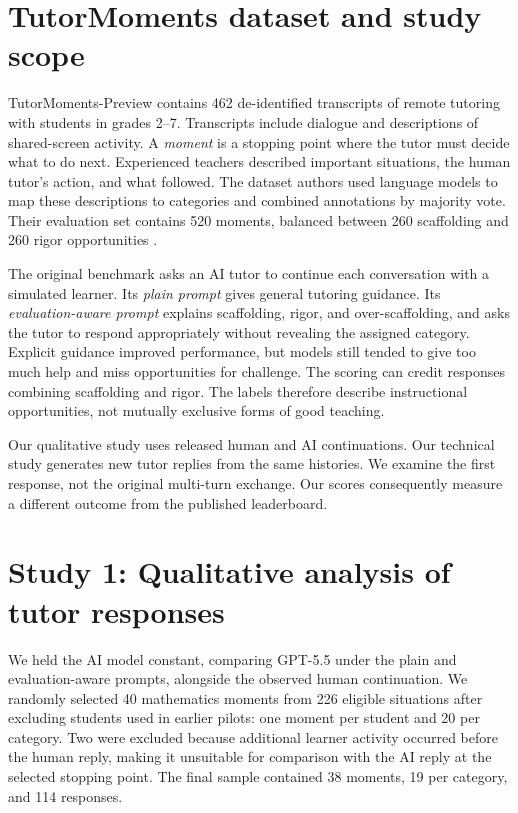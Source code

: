 \documentclass[10pt,a4paper]{article}
\begin{document}
\section{TutorMoments dataset and study scope}
TutorMoments-Preview contains 462 de-identified transcripts of remote tutoring with students in grades 2--7. Transcripts include dialogue and descriptions of shared-screen activity. A \emph{moment} is a stopping point where the tutor must decide what to do next. Experienced teachers described important situations, the human tutor's action, and what followed. The dataset authors used language models to map these descriptions to categories and combined annotations by majority vote. Their evaluation set contains 520 moments, balanced between 260 scaffolding and 260 rigor opportunities \citep{zhang2026tutormoments}.

The original benchmark asks an AI tutor to continue each conversation with a simulated learner. Its \emph{plain prompt} gives general tutoring guidance. Its \emph{evaluation-aware prompt} explains scaffolding, rigor, and over-scaffolding, and asks the tutor to respond appropriately without revealing the assigned category. Explicit guidance improved performance, but models still tended to give too much help and miss opportunities for challenge. The scoring can credit responses combining scaffolding and rigor. The labels therefore describe instructional opportunities, not mutually exclusive forms of good teaching.

Our qualitative study uses released human and AI continuations. Our technical study generates new tutor replies from the same histories. We examine the first response, not the original multi-turn exchange. Our scores consequently measure a different outcome from the published leaderboard.

\section{Study 1: Qualitative analysis of tutor responses}
We held the AI model constant, comparing GPT-5.5 under the plain and evaluation-aware prompts, alongside the observed human continuation. We randomly selected 40 mathematics moments from 226 eligible situations after excluding students used in earlier pilots: one moment per student and 20 per category. Two were excluded because additional learner activity occurred before the human reply, making it unsuitable for comparison with the AI reply at the selected stopping point. The final sample contained 38 moments, 19 per category, and 114 responses.
\end{document}
